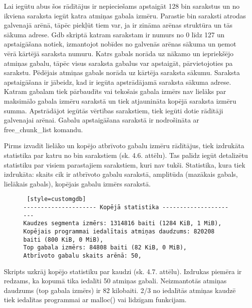 Lai iegūtu abus šos rādītājus ir nepieciešams apstaigāt 128 bin sarakstus un no ikviena saraksta iegūt katra atmiņas gabala izmēru.
Parastie bin saraksti atrodas galvenajā arēnā, tāpēc piekļūt tiem var, ja ir zināma arēnas struktūra un tās sākuma adrese.
Gdb skriptā katram sarakstam ir numurs no 0 līdz 127 un apstaigāšana notiek, izmantojot nobīdes no galvenās arēnas sākuma un ņemot vērā kārtējā saraksta numuru.
Katrs gabals norāda uz nākamo un iepriekšējo atmiņas gabalu, tāpēc visus saraksta gabalus var apstaigāt, pārvietojoties pa sarakstu.
Pēdējais atmiņas gabals norāda uz kārtēja saraksta sākumu.
Saraksta apstaigāšana ir jābeidz, kad ir iegūta apstrādājamā saraksta sākuma adrese.
Katram gabalam tiek pārbaudīts vai tekošais gabala izmērs nav lielāks par maksimālo gabala izmēru sarakstā un tiek atjaunināta kopējā saraksta izmēru summa.
Apstrādājot iegūtās vērtības sarakstiem, tiek iegūti dotie rādītāji galvenajai arēnai.
Gabalu apstaigāšana sarakstā ir nodrošināta ar free\_chunk\_list komandu.

Pirms izvadīt lielāko un kopējo atbrīvoto gabalu izmēru rādītājus, tiek izdrukāta statistika par katru no bin sarakstiem (sk. 4.6. attēlu).
Tas palīdz iegūt detalizētu statistiku par visiem parastajiem sarakstiem, kuri nav tukši.
Statistika, kura tiek izdrukāta: skaits cik ir atbrīvoto gabalu sarakstā, amplitūda (mazākais gabals, lielākais gabals), kopējais gabalu izmērs sarakstā.

\begin{figure}[h]
\begin{lstlisting} [style=customgdb]
--------------------- Kopējā statistika ----------------------
Kaudzes segmenta izmērs: 1314816 baiti (1284 KiB, 1 MiB),
Kopējais programmai iedalītais atmiņas daudzums: 820208 baiti (800 KiB, 0 MiB),
Top gabala izmērs: 84808 baiti (82 KiB, 0 MiB),
Atbrīvoto gabalu skaits arēnā: 50,
\end{lstlisting}
\caption{\textbf{\fontsize{11}{12}\selectfont {Kopējā statistika}}}
\end{figure}

Skripts uzkrāj kopējo statistiku par kaudzi (sk. 4.7. attēlu). Izdrukas piemēra  ir redzams, ka kopumā tika iedalīti 50 atmiņas gabali.
Neizmantotās atmiņas daudzums (top gabala izmērs) ir 82 kilobaiti.
2/3 no iedalītās atmiņas kaudzē tiek iedalītas programmai ar malloc() vai lidzīgam funkcijam.






